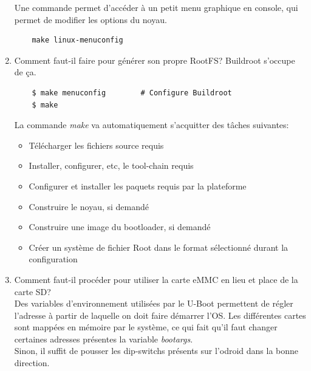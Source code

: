 \begin{enumerate}
	Une commande permet d'accéder à un petit menu graphique en console, qui permet de modifier les options du noyau.
	\begin{lstlisting}
	make linux-menuconfig
	\end{lstlisting}
	\item Comment faut-il faire pour générer son propre RootFS?
	Buildroot s'occupe de ça. 
	\begin{lstlisting}
	$ make menuconfig        # Configure Buildroot
	$ make
	\end{lstlisting}
	La commande \textit{make} va automatiquement s'acquitter des tâches suivantes:
	\begin{itemize}
		\item Télécharger les fichiers source requis
		\item Installer, configurer, etc, le tool-chain requis
		\item Configurer et installer les paquets requis par la plateforme 
		\item Construire le noyau, si demandé
		\item Construire une image du bootloader, si demandé
		\item Créer un système de fichier Root dans le format sélectionné durant la configuration
	\end{itemize}
	\item Comment faut-il procéder pour utiliser la carte eMMC en lieu et place de la carte SD?\\
	
	Des variables d'environnement utilisées par le U-Boot permettent de régler l'adresse à partir de laquelle on doit faire démarrer l'OS. Les différentes cartes sont mappées en mémoire par le système, ce qui fait qu'il faut changer certaines adresses présentes la variable \textit{bootargs}.\\
	Sinon, il suffit de pousser les dip-switchs présents sur l'odroid dans la bonne direction.
\end{enumerate}


